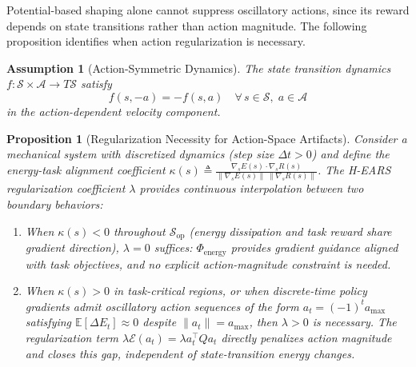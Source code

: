 \documentclass[journal]{IEEEtran}
\newtheorem{proposition}[theorem]{Proposition}
\newtheorem{assumption}{Assumption}
\begin{document}
	Potential-based shaping alone cannot suppress oscillatory actions, since its reward depends on state transitions rather than action magnitude. The following proposition identifies when action regularization is necessary.
	
	\begin{assumption}[Action-Symmetric Dynamics]
		\label{ass:action_symmetry}
		The state transition dynamics $f:\mathcal{S}\times\mathcal{A}\to T\mathcal{S}$ satisfy
		\begin{equation}
			f(s, -a) = -f(s, a) \quad \forall\, s\in\mathcal{S},\; a\in\mathcal{A}
			\label{eq:action_symmetry}
		\end{equation}
		in the action-dependent velocity component.
	\end{assumption}
	
	\begin{proposition}[Regularization Necessity for Action-Space Artifacts]
		\label{prop:regularization_necessity}
		Consider a mechanical system with discretized dynamics (step size $\Delta t > 0$) and define the energy-task alignment coefficient $\kappa(s) \triangleq \frac{\nabla_s E(s) \cdot \nabla_s R(s)}{\|\nabla_s E(s)\|\,\|\nabla_s R(s)\|}$. The H-EARS regularization coefficient $\lambda$ provides continuous interpolation between two boundary behaviors:
		
		\begin{enumerate}
			\item When $\kappa(s) < 0$ throughout $\mathcal{S}_{\text{op}}$ (energy dissipation and task reward share gradient direction), $\lambda = 0$ suffices: $\Phi_{\text{energy}}$ provides gradient guidance aligned with task objectives, and no explicit action-magnitude constraint is needed.
			
			\item When $\kappa(s) > 0$ in task-critical regions, or when discrete-time policy gradients admit oscillatory action sequences of the form $a_t = (-1)^t a_{\max}$ satisfying $\mathbb{E}[\Delta E_t] \approx 0$ despite $\|a_t\| = a_{\max}$, then $\lambda > 0$ is necessary. The regularization term $\lambda\mathcal{E}(a_t) = \lambda a_t^\top Q a_t$ directly penalizes action magnitude and closes this gap, independent of state-transition energy changes.
		\end{enumerate}
	\end{proposition}
	
\end{document}

